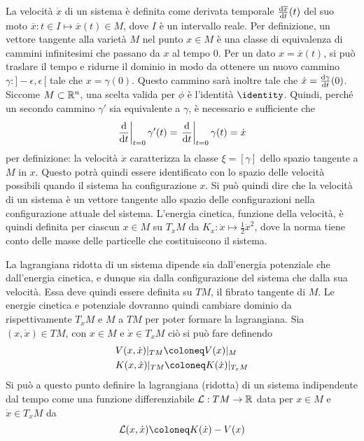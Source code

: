 La velocità $\dot{x}$ di un sistema è definita come derivata temporale $\dv{\overline{x}}{t}()(t)$ del suo moto $\overline{x}: t \in I \mapsto \overline{x}(t) \in M$, dove $I$ è un intervallo reale. Per definizione, un vettore tangente alla varietà $M$ nel punto $x \in M$ è una classe di equivalenza di cammini infinitesimi che passano da $x$ al tempo $0$. Per un dato $x =\overline{x}(t)$, si può traslare il tempo e ridurne il dominio in modo da ottenere un nuovo cammino $\gamma:]-\epsilon, \epsilon\,[$ tale che $x = \gamma(0)$. Questo cammino sarà inoltre tale che $\dot{x} = \dv{\gamma}{t}()(0)$. Siccome $M \subset \mathbb{R}^{n}$, una scelta valida per $\phi$ è l'identità $\identity$. Quindi, perché un secondo cammino $\gamma'$ sia equivalente a $\gamma$, è necessario e sufficiente che \begin{equation}
\eval{\dv{t}}_{t=0} \gamma'(t) = \eval{\dv{t}}_{t=0} \gamma(t) = \dot{x}
\end{equation}
per definizione: la velocità $\dot{x}$ caratterizza la classe $\xi = [\gamma]$ dello spazio tangente a $M$ in $x$. Questo potrà quindi essere identificato con lo spazio delle velocità possibili quando il sistema ha configurazione $x$. Si può quindi dire che la velocità di un sistema è un vettore tangente allo spazio delle configurazioni nella configurazione attuale del sistema. L'energia cinetica, funzione della velocità, è quindi definita per ciascun $x \in M$ su $T_x M$ da $K_x: \dot{x} \mapsto \frac{1}{2} \dot{x}^2$, dove la norma tiene conto delle masse delle particelle che costituiscono il sistema.

La lagrangiana ridotta di un sistema dipende sia dall'energia potenziale che dall'energia cinetica, e dunque sia dalla configurazione del sistema che dalla sua velocità. Essa deve quindi essere definita su $TM$, il fibrato tangente di $M$. Le energie cinetica e potenziale dovranno quindi cambiare dominio da rispettivamente $T_x M$ e $M$ a $TM$ per poter formare la lagrangiana. Sia $(x,\dot{x}) \in TM$, con $x \in M$ e $\dot{x} \in T_x M$ ciò si può fare definendo \begin{equation}
\begin{aligned}
  &V(x,\dot{x})|_{TM} \defeq V(x)|_M \\
  &K(x, \dot{x})|_{TM} \defeq K(\dot{x})|_{T_x M}
\end{aligned}
\end{equation} 
Si può a questo punto definire la lagrangiana (ridotta) di un sistema indipendente dal tempo come una funzione differenziabile $\mathcal{L}:TM\to \mathbb{R}$ data per $x \in M$ e $\dot{x} \in T_x M$ da \begin{equation}
\mathcal{L}(x,\dot{x}) \defeq K(\dot{x}) - V(x)
\end{equation}

